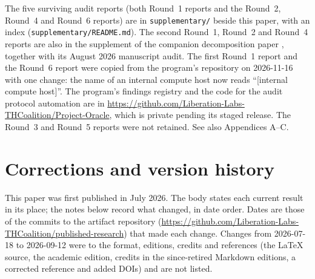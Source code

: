 \documentclass[11pt,letterpaper]{article}
\begin{document}
The five surviving audit reports (both Round~1 reports and the Round~2, Round~4 and Round~6 reports)
are in \texttt{supplementary/} beside this paper, with an index (\texttt{supplementary/README.md}).
The second Round~1, Round~2 and Round~4 reports are also in the supplement of the companion
decomposition paper \cite{cc2026composites}, together with its August 2026 manuscript audit. The
first Round~1 report and the Round~6 report were copied from the program's repository on 2026-11-16
with one change: the name of an internal compute host now reads ``[internal compute host]''. The
program's findings registry and the code for the audit protocol automation are in
\url{https://github.com/Liberation-Labs-THCoalition/Project-Oracle}, which is private pending its
staged release. The Round~3 and Round~5 reports were not retained.
See also Appendices A--C.

\label{sec:corrections}
\section*{Corrections and version history}

This paper was first published in July 2026. The body states each current result in its place; the
notes below record what changed, in date order. Dates are those of the commits to the artifact
repository (\url{https://github.com/Liberation-Labs-THCoalition/published-research}) that made each
change. Changes from 2026-07-18 to 2026-09-12 were to the format, editions, credits and references
(the LaTeX source, the academic edition, credits in the since-retired Markdown editions, a corrected
reference and added DOIs) and are not listed.
\end{document}
